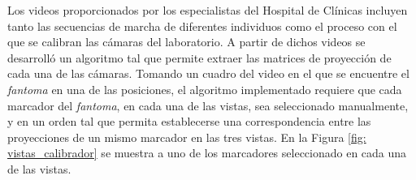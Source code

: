 Los videos proporcionados por los especialistas del Hospital de Clínicas incluyen tanto las secuencias de marcha de diferentes individuos como el proceso con el que se calibran las cámaras del laboratorio. A partir de dichos videos se desarrolló un algoritmo tal que permite extraer las matrices de proyección de cada una de las cámaras. Tomando un cuadro del video en el que se encuentre el \textit{fantoma} en una de las posiciones, el algoritmo implementado requiere que cada marcador del \textit{fantoma}, en cada una de las vistas, sea seleccionado manualmente, y en un orden tal que permita establecerse una correspondencia entre las proyecciones de un mismo marcador en las tres vistas. En la Figura \ref{fig: vistas_calibrador} se muestra a uno de los marcadores seleccionado en cada una de las vistas.
\vspace{-0.53cm}
